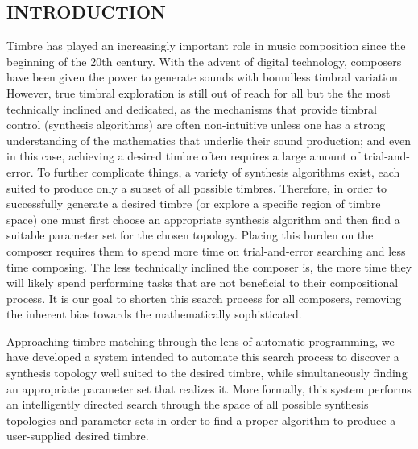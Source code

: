 \documentclass[12pt]{report} 	%
\numberwithin{figure}{chapter}
\numberwithin{table}{chapter}
\numberwithin{equation}{chapter}
\begin{document}
\begin{flushleft}
\newlength{\QuarterPage}
\setlength{\QuarterPage}{1.0in}
				
\vspace*{\QuarterPage}
\newpage
{}
\chapter{INTRODUCTION} %
Timbre has played an increasingly important role in music composition since the beginning of the 20th century. With the advent of digital technology, composers have been given the power to generate sounds with boundless timbral variation. However, true timbral exploration is still out of reach for all but the the most technically inclined and dedicated, as the mechanisms that provide timbral control (synthesis algorithms) are often non-intuitive unless one has a strong understanding of the mathematics that underlie their sound production; and even in this case, achieving a desired timbre often requires a large amount of trial-and-error. To further complicate things, a variety of synthesis algorithms exist, each suited to produce only a subset of all possible timbres. Therefore, in order to successfully generate a desired timbre (or explore a specific region of timbre space) one must first choose an appropriate synthesis algorithm and then find a suitable parameter set for the chosen topology. Placing this burden on the composer requires them to spend more time on trial-and-error searching and less time composing. The less technically inclined the composer is, the more time they will likely spend performing tasks that are not beneficial to their compositional process. It is our goal to shorten this search process for all composers, removing the inherent bias towards the mathematically sophisticated.

Approaching timbre matching through the lens of automatic programming, we have developed a system intended to automate this search process to discover a synthesis topology well suited to the desired timbre, while simultaneously finding an appropriate parameter set that realizes it. More formally, this system performs an intelligently directed search through the space of all possible synthesis topologies and parameter sets in order to find a proper algorithm to produce a user-supplied desired timbre.


\end{flushleft}
\end{document}
